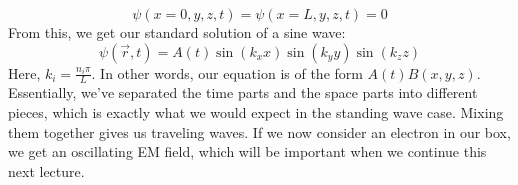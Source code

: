       $$\psi(x=0,y,z,t) = \psi(x=L,y,z,t) = 0$$
      From this, we get our standard solution of a sine wave:
      $$\psi(\vec{r},t) = A(t)\sin(k_xx)\sin(k_yy)\sin(k_zz)$$
      Here, $k_i = \frac{n_i\pi}{L}$. In other words, our equation is of the form $A(t)B(x,y,z)$. Essentially, we've separated the time parts and the space parts into different pieces, which is exactly what we would expect in the standing wave case. Mixing them together gives us traveling waves. If we now consider an electron in our box, we get an oscillating EM field, which will be important when we continue this next lecture.